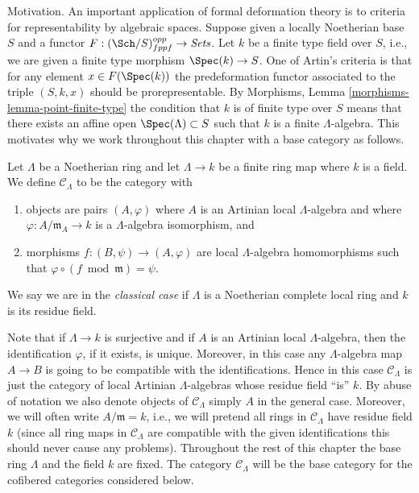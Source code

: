 \noindent
Motivation. An important application of formal deformation theory is
to criteria for representability by algebraic spaces. Suppose given a
locally Noetherian base $S$ and a functor
$F : (\Sch/S)_{fppf}^{opp} \to \textit{Sets}$.
Let $k$ be a finite type field over $S$, i.e., we are given a
finite type morphism $\Spec(k) \to S$.
One of Artin's criteria is that for any element $x \in F(\Spec(k))$
the predeformation functor associated to
the triple $(S, k, x)$ should be prorepresentable. By
Morphisms, Lemma \ref{morphisms-lemma-point-finite-type}
the condition that $k$ is of finite type over $S$ means that there exists
an affine open $\Spec(\Lambda) \subset S$ such that $k$
is a finite $\Lambda$-algebra. This motivates why we work throughout
this chapter with a base category as follows.

\begin{definition}
\label{definition-CLambda}
Let $\Lambda$ be a Noetherian ring and let $\Lambda \to k$ be a finite
ring map where $k$ is a field. We define {\it $\mathcal{C}_\Lambda$} to be
the category with
\begin{enumerate}
\item objects are pairs $(A, \varphi)$ where $A$ is an Artinian local
$\Lambda$-algebra and where $\varphi : A/\mathfrak m_A \to k$ is a
$\Lambda$-algebra isomorphism, and
\item morphisms $f : (B, \psi) \to (A, \varphi)$ are local $\Lambda$-algebra
homomorphisms such that $\varphi \circ (f \bmod \mathfrak m) = \psi$.
\end{enumerate}
We say we are in the {\it classical case} if $\Lambda$ is a Noetherian
complete local ring and $k$ is its residue field.
\end{definition}

\noindent
Note that if $\Lambda \to k$ is surjective and if $A$ is an Artinian local
$\Lambda$-algebra, then the identification $\varphi$, if it exists,
is unique. Moreover, in this case any $\Lambda$-algebra map $A \to B$ is
going to be compatible with the identifications. Hence in this case
$\mathcal{C}_\Lambda$ is just the category of local Artinian $\Lambda$-algebras
whose residue field ``is'' $k$. By abuse of notation we also denote objects of
$\mathcal{C}_\Lambda$ simply $A$ in the general case. Moreover, we will
often write $A/\mathfrak m = k$, i.e., we will pretend all rings in
$\mathcal{C}_\Lambda$ have residue field $k$ (since all ring maps in
$\mathcal{C}_\Lambda$ are compatible with the given identifications this
should never cause any problems).
Throughout the rest of this chapter the base ring $\Lambda$ and the
field $k$ are fixed. The category $\mathcal{C}_\Lambda$ will be the base
category for the cofibered categories considered below.

